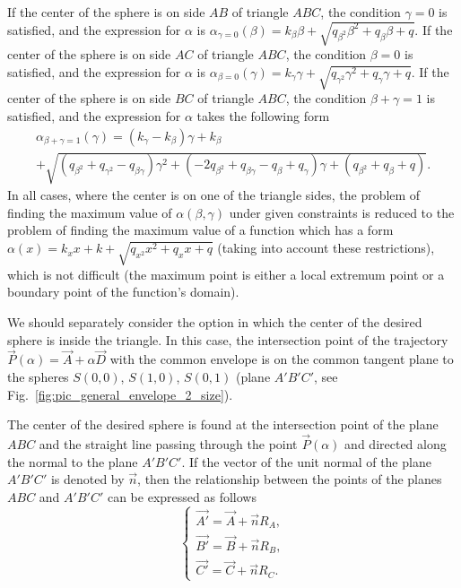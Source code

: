 \documentclass[
11pt,
tightenlines,
twoside,
onecolumn,
nofloats,
nobibnotes,
nofootinbib,
superscriptaddress,
noshowpacs,
centertags]
{revtex4-2}
\begin{document}
If the center of the sphere is on side $AB$ of triangle  $ABC$, the
condition $\gamma = 0$ is satisfied, and the expression for $\alpha$
is $\alpha_{\gamma = 0}(\beta) = k_{\beta} \beta + \sqrt{q_{\beta^2}
\beta^2 + q_{\beta} \beta + q}$.
If the center of the sphere is on side $AC$ of triangle $ABC$,  the
condition $\beta = 0$ is satisfied, and the expression for $\alpha$
is $\alpha_{\beta = 0}(\gamma) = k_{\gamma} \gamma +
\sqrt{q_{\gamma^2} \gamma^2 + q_{\gamma} \gamma + q}$.
If the center of the sphere is on side $BC$ of triangle $ABC$,  the
condition $\beta + \gamma = 1$ is satisfied, and the expression for
$\alpha$ takes the following form
\begin{multline}
\alpha_{\beta + \gamma = 1}(\gamma) = (k_{\gamma} - k_{\beta}) \gamma + k_{\beta}  \\
+\sqrt{(q_{\beta^2} + q_{\gamma^2} - q_{\beta \gamma}) \gamma^2 +
(-2 q_{\beta^2} + q_{\beta \gamma} - q_{\beta} + q_{\gamma}) \gamma
+ (q_{\beta^2} + q_{\beta} + q)}.
\end{multline}
In all cases, where the center is on one of the triangle sides, the
problem of finding the maximum value of $\alpha(\beta, \gamma)$
under given constraints is reduced to the problem of finding the
maximum value of a function which has a form $\alpha(x) = k_x x + k
+ \sqrt {q_{x^2} x^2 + q_x x + q}$ (taking into account these
restrictions), which is not difficult (the maximum point is either a
local extremum point or a boundary point of the function's domain).

We should separately consider the option in which the center of  the
desired sphere is inside the triangle.
In this case, the intersection point of the trajectory
$\vec{P}(\alpha) = \vec{A} + \alpha \vec{D}$ with the common
envelope is on the common tangent plane to the spheres $S(0, 0)$,
$S(1, 0)$, $S(0, 1)$ (plane $A'B'C'$, see
Fig.~\ref{fig:pic_general_envelope_2_size}).

The center of the desired sphere is found at the intersection  point
of the plane $ABC$ and the straight line passing through the point
$\vec{P}(\alpha)$ and directed along the normal to the plane
$A'B'C'$.
If the vector of the unit normal of the plane $A'B'C'$ is  denoted
by $\vec{n}$, then the relationship between the points of the planes
$ABC$ and $A'B'C'$ can be expressed as follows
\begin{equation}
\begin{cases}
\vec{A'} = \vec{A} + \vec{n} R_A, \\
\vec{B'} = \vec{B} + \vec{n} R_B, \\
\vec{C'} = \vec{C} + \vec{n} R_C.
\end{cases}
\end{equation}
\end{document}
